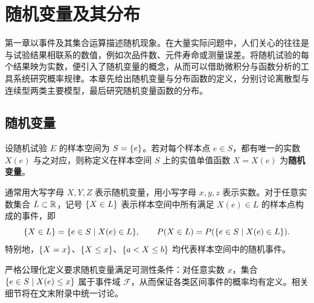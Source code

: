 %
%
\chapter{随机变量及其分布}
\label{ch:random-variables}

第一章以事件及其集合运算描述随机现象。在大量实际问题中，人们关心的往往是与试验结果相联系的数值，例如次品件数、元件寿命或测量误差。将随机试验的每个结果映为实数，便引入了随机变量的概念，从而可以借助微积分与函数分析的工具系统研究概率规律。本章先给出随机变量与分布函数的定义，分别讨论离散型与连续型两类主要模型，最后研究随机变量函数的分布。

\section{随机变量}
\label{sec:random-variable}

\begin{definition}[随机变量]
\label{def:random-variable}
设随机试验 $E$ 的样本空间为 $S=\{e\}$。若对每个样本点 $e\in S$，都有唯一的实数 $X(e)$ 与之对应，则称定义在样本空间 $S$ 上的实值单值函数 $X=X(e)$ 为\textbf{随机变量}。
\end{definition}

通常用大写字母 $X,Y,Z$ 表示随机变量，用小写字母 $x,y,z$ 表示实数。对于任意实数集合 $L\subset\mathbb{R}$，记号 $\{X\in L\}$ 表示样本空间中所有满足 $X(e)\in L$ 的样本点构成的事件，即
\[
  \{X\in L\}=\{e\in S\mid X(e)\in L\},\qquad
  P(X\in L)=P(\{e\in S\mid X(e)\in L\}).
\]
特别地，$\{X=x\}$、$\{X\le x\}$、$\{a<X\le b\}$ 均代表样本空间中的随机事件。

\begin{remark}[可测性说明]
严格公理化定义要求随机变量满足可测性条件：对任意实数 $x$，集合 $\{e\in S\mid X(e)\le x\}$ 属于事件域 $\mathcal{F}$，从而保证各类区间事件的概率均有定义。相关细节将在文末附录中统一讨论。
\end{remark}

